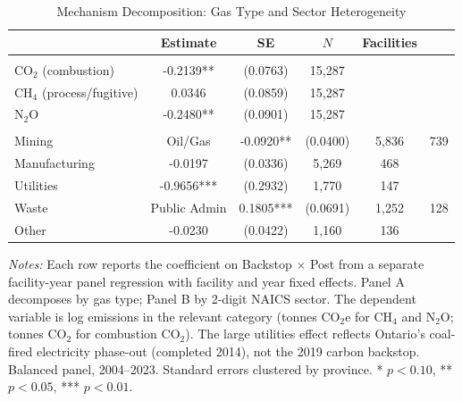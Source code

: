 \begin{table}[htbp]
\centering
\caption{Mechanism Decomposition: Gas Type and Sector Heterogeneity}
\label{tab:mechanism}
\begin{tabular}{lcccc}
\hline\hline
 & Estimate & SE & $N$ & Facilities \\
\hline
\addlinespace
{} \\
\addlinespace
CO$_2$ (combustion) & -0.2139** & (0.0763) & 15,287 & \\
CH$_4$ (process/fugitive) & 0.0346 & (0.0859) & 15,287 & \\
N$_2$O & -0.2480** & (0.0901) & 15,287 & \\
\addlinespace
{} \\
\addlinespace
Mining & Oil/Gas & -0.0920** & (0.0400) & 5,836 & 739 \\
Manufacturing & -0.0197 & (0.0336) & 5,269 & 468 \\
Utilities & -0.9656*** & (0.2932) & 1,770 & 147 \\
Waste & Public Admin & 0.1805*** & (0.0691) & 1,252 & 128 \\
Other & -0.0230 & (0.0422) & 1,160 & 136 \\
\hline\hline
\end{tabular}
\begin{tablenotes}
\small
\item \textit{Notes:} Each row reports the coefficient on Backstop $\times$ Post from a separate facility-year panel regression with facility and year fixed effects. Panel A decomposes by gas type; Panel B by 2-digit NAICS sector. The dependent variable is log emissions in the relevant category (tonnes CO$_2$e for CH$_4$ and N$_2$O; tonnes CO$_2$ for combustion CO$_2$). The large utilities effect reflects Ontario's coal-fired electricity phase-out (completed 2014), not the 2019 carbon backstop. Balanced panel, 2004--2023. Standard errors clustered by province. * $p<0.10$, ** $p<0.05$, *** $p<0.01$.
\end{tablenotes}
\end{table}

